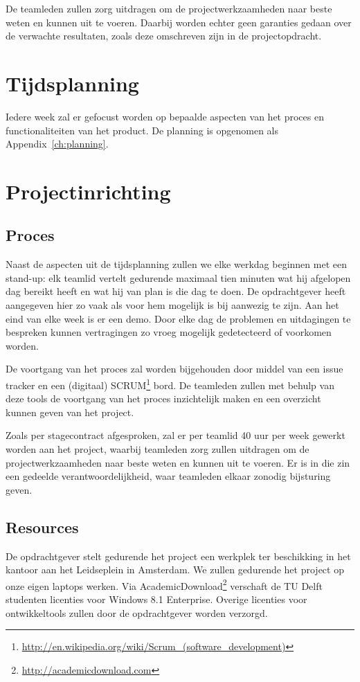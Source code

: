 De teamleden zullen zorg uitdragen om de projectwerkzaamheden naar beste weten en kunnen uit te voeren. Daarbij worden echter geen garanties gedaan over de verwachte resultaten, zoals deze omschreven zijn in de projectopdracht.

\section{Tijdsplanning}
Iedere week zal er gefocust worden op bepaalde aspecten van het proces en functionaliteiten van het product. De planning is opgenomen als Appendix~\ref{ch:planning}.

\section{Projectinrichting}

\subsection{Proces}
Naast de aspecten uit de tijdsplanning zullen we elke werkdag beginnen met een stand-up: elk teamlid vertelt gedurende maximaal tien minuten wat hij afgelopen dag bereikt heeft en wat hij van plan is die dag te doen. De opdrachtgever heeft aangegeven hier zo vaak als voor hem mogelijk is bij aanwezig te zijn. Aan het eind van elke week is er een demo. Door elke dag de problemen en uitdagingen te bespreken kunnen vertragingen zo vroeg mogelijk gedetecteerd of voorkomen worden. 

De voortgang van het proces zal worden bijgehouden door middel van een issue tracker en een (digitaal) SCRUM\footnote{\url{http://en.wikipedia.org/wiki/Scrum_(software_development)}} bord. De teamleden zullen met behulp van deze tools de voortgang van het proces inzichtelijk maken en een overzicht kunnen geven van het project.

Zoals per stagecontract afgesproken, zal er per teamlid 40 uur per week gewerkt worden aan het project, waarbij teamleden zorg zullen uitdragen om de projectwerkzaamheden naar beste weten en kunnen uit te voeren. Er is in die zin een gedeelde verantwoordelijkheid, waar teamleden elkaar zonodig bijsturing geven. 

\subsection{Resources}
De opdrachtgever stelt gedurende het project een werkplek ter beschikking in het kantoor aan het Leidseplein in Amsterdam. We zullen gedurende het project op onze eigen laptops werken. Via AcademicDownload\footnote{\url{http://academicdownload.com}} verschaft de TU Delft studenten licenties voor Windows 8.1 Enterprise. Overige licenties voor ontwikkeltools zullen door de opdrachtgever worden verzorgd.

